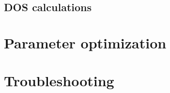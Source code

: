 \documentclass[colorlinks=true,urlcolor=blue,linkcolor=blue,citecolor=red]{article}
\begin{document}
\subsection{DOS calculations}
\label{sec-3-2}
\section{Parameter optimization}
\label{sec-4}
\section{Troubleshooting}
\label{sec-5}


\end{document}
